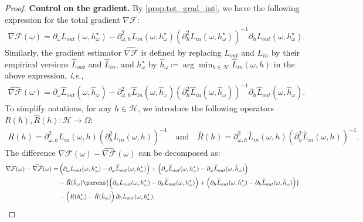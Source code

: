 \begin{proof}
{\bf Control on the gradient.}
By \cref{prop:tot_grad_int}, we have the following expression for the total gradient $\nabla\mathcal{F}$:
\begin{align*}
    \nabla\mathcal{F}(\omega)=\partial_\omega L_{out}(\omega, h^\star_\omega)-\partial_{\omega, h}^2 L_{in}(\omega, h^\star_\omega)\left(\partial_h^2 L_{in}(\omega, h^\star_\omega)\right)^{-1}\partial_h L_{out}(\omega, h^\star_\omega).
\end{align*}
{Similarly, the gradient estimator $\widehat{\nabla\mathcal{F}}$ is defined by replacing $L_{out}$ and $L_{in}$ by their empirical versions $\widehat{L}_{out}$ and $\widehat{L}_{in}$, and $h_{\omega}^{\star}$ by $\hat{h}_{\omega}\coloneqq\arg\min_{h\in \mathcal{H}} \widehat{L}_{in}(\omega,h)$ in the above expression, \textit{i.e.},}
\begin{align*}
    \widehat{\nabla\mathcal{F}}(\omega)=\partial_\omega\widehat{L}_{out}(\omega, \hat{h}_\omega)-\partial_{\omega, h}^2 \widehat{L}_{in}(\omega, \hat{h}_\omega)\left(\partial_h^2 \widehat{L}_{in}(\omega, \hat{h}_\omega)\right)^{-1}\partial_h \widehat{L}_{out}(\omega, \hat{h}_\omega).
\end{align*}
To simplify notations, for any $h\in\mathcal{H}$, we introduce the following operators $R(h), \hat{R}(h):\mathcal{H}\to\Omega$:    \begin{align*}
        R(h)=\partial_{\omega, h}^2L_{in}(\omega, h)\left(\partial_h^2 L_{in}(\omega, h)\right)^{-1}\quad\text{and}\quad 
        \hat{R}(h)=\partial_{\omega, h}^2\widehat{L}_{in}(\omega, h)\left(\partial_h^2 \widehat{L}_{in}(\omega, h)\right)^{-1}.
    \end{align*}
    The difference $\nabla\mathcal{F}(\omega)-\widehat{\nabla\mathcal{F}}(\omega)$ can be decomposed as:
    \begin{align*}
        \nabla\mathcal{F}(\omega)-\widehat{\nabla\mathcal{F}}(\omega)=&\left(\partial_\omega L_{out}(\omega,h^\star_\omega)-\partial_\omega \widehat{L}_{out}(\omega,h^\star_\omega)\right)+\left(\partial_\omega \widehat{L}_{out}(\omega,h^\star_\omega)-\partial_\omega \widehat{L}_{out}(\omega,\hat{h}_\omega)\right)\\
        &-\hat{R}(\hat{h}_\omega)\parens{\left(\partial_h L_{out}(\omega,h^\star_\omega)-\partial_h\widehat{L}_{out}(\omega,h^\star_\omega)\right)+ \left(\partial_h\widehat{L}_{out}(\omega,h^\star_\omega)-\partial_h\widehat{L}_{out}(\omega,\hat{h}_\omega)\right)}\\
                &-\left(R(h^\star_\omega)-\hat{R}(\hat{h}_\omega)\right)\partial_h L_{out}(\omega,h^\star_\omega).

\end{align*}
\end{proof}
